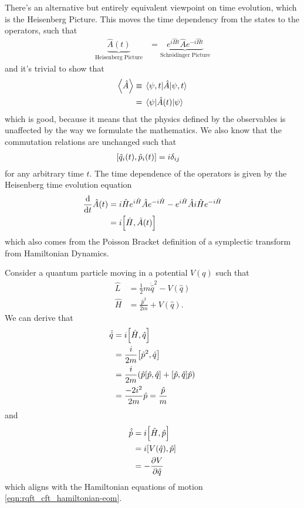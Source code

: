 \documentclass[notes.tex]{subfiles}
\begin{document}
There's an alternative but entirely equivalent viewpoint on time evolution, which is the Heisenberg Picture. This moves the time dependency from the states to the operators, such that
\begin{align*}
    \underbrace{\hat{A}(t)}_{\text{Heisenberg Picture}} &=\underbrace{ e^{i\hat{H}t} \hat{A} e^{-i\hat{H}t}}_{\text{Schr\"odinger Picture}}
\end{align*}
and it's trivial to show that
\begin{align*}
    \expval{\hat{A}} &\equiv \expval{\hat{A}}{\psi, t} \\
    &= \expval{\hat{A}(t)}{\psi}
\end{align*}
which is good, because it means that the physics defined by the observables is unaffected by the way we formulate the mathematics.
We also know that the commutation relations are unchanged such that
\begin{align*}
    \commutator{\hat{q}_i(t)}{\hat{p}_i(t)} &= i\delta_{ij}
\end{align*}
for any arbitrary time $t$.
The time dependence of the operators is given by the Heisenberg time evolution equation
\begin{align*}
    \dv{t}\hat{A}(t) &= i\hat{H} e^{i\hat{H}}\hat{A} e^{-i\hat{H}} - e^{i\hat{H}}\hat{A} i\hat{H} e^{-i\hat{H}} \\
    &= i\commutator{\hat{H}}{\hat{A}(t)}
\end{align*}
which also comes from the Poisson Bracket definition of a symplectic transform from Hamiltonian Dynamics. 

\begin{example}
    Consider a quantum particle moving in a potential $V(q)$ such that
    \begin{align*}
        \hat{L} &= \frac{1}{2}m\dot{\hat{q}}^2 - V(\hat{q})\\
        \hat{H} &= \frac{\hat{p}^2}{2m} + V(\hat{q}).
    \end{align*}
    We can derive that
    \begin{align*}
        \hat{\dot{q}} &= i\commutator{\hat{H}}{\hat{q}}\\
        &= \frac{i}{2m}\commutator{\hat{p}^2}{\hat{q}}\\
        &= \frac{i}{2m}\qty(\hat{p}\commutator{\hat{p}}{\hat{q}} + \commutator{\hat{p}}{\hat{q}}\hat{p})\\
        &= \frac{-2i^2}{2m}\hat{p} = \frac{\hat{p}}{m}
    \end{align*}
    and
    \begin{align*}
        \hat{\dot{p}} &= i\commutator{\hat{H}}{\hat{p}}\\
        &= i\commutator{V(\hat{q})}{\hat{p}}\\
        &= -\pdv{V}{\hat{q}}
    \end{align*}
    which aligns with the Hamiltonian equations of motion \autoref{eqn:rqft_cft_hamiltonian-eom}.
\end{example}
\end{document}
